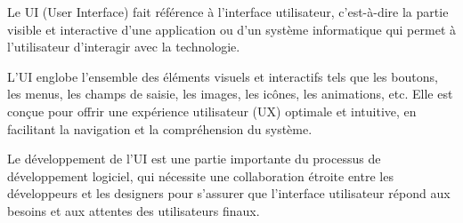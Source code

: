 Le UI (User Interface) fait référence à l'interface utilisateur, c'est-à-dire la partie visible et interactive d'une application ou d'un système informatique qui permet à l'utilisateur d'interagir avec la technologie.

L'UI englobe l'ensemble des éléments visuels et interactifs tels que les boutons, les menus, les champs de saisie, les images, les icônes, les animations, etc. Elle est conçue pour offrir une expérience utilisateur (UX) optimale et intuitive, en facilitant la navigation et la compréhension du système.

Le développement de l'UI est une partie importante du processus de développement logiciel, qui nécessite une collaboration étroite entre les développeurs et les designers pour s'assurer que l'interface utilisateur répond aux besoins et aux attentes des utilisateurs finaux.
